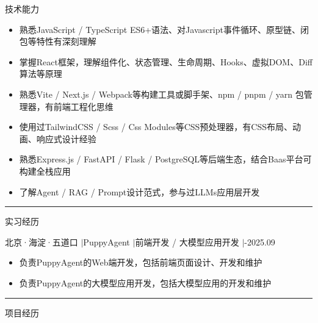 \documentclass[11pt,a4paper]{ctexart}
\begin{document}
{\heiti 技术能力}
\begin{itemize}[itemsep=0pt,parsep=0pt,topsep=0pt]
    \item {\songti 熟悉JavaScript / TypeScript ES6+语法、对Javascript事件循环、原型链、闭包等特性有深刻理解}
    \item {\songti 掌握React框架，理解组件化、状态管理、生命周期、Hooks、虚拟DOM、Diff算法等原理}
    \item {\songti 熟悉Vite / Next.js / Webpack等构建工具或脚手架、npm / pnpm / yarn 包管理器，有前端工程化思维}
    \item {\songti 使用过TailwindCSS / Scss / Css Modules等CSS预处理器，有CSS布局、动画、响应式设计经验}
    \item {\songti 熟悉Express.js / FastAPI / Flask / PostgreSQL等后端生态，结合Baas平台可构建全栈应用}
    \item {\songti 了解Agent / RAG / Prompt设计范式，参与过LLMs应用层开发}
\end{itemize}

\vspace{1em}
\hrule
\vspace{1em}

{\heiti 实习经历}

{\heiti 北京·海淀·五道口 \quad$|$\quad PuppyAgent \quad$|$\quad 前端开发 / 大模型应用开发 \quad$|$-2025.09}

\begin{itemize}[itemsep=0pt,parsep=0pt,topsep=0pt]
    \item 负责PuppyAgent的Web端开发，包括前端页面设计、开发和维护
    \item 负责PuppyAgent的大模型应用开发，包括大模型应用的开发和维护
\end{itemize}

\vspace{1em}
\hrule
\vspace{1em}

{\heiti 项目经历}
\end{document}
